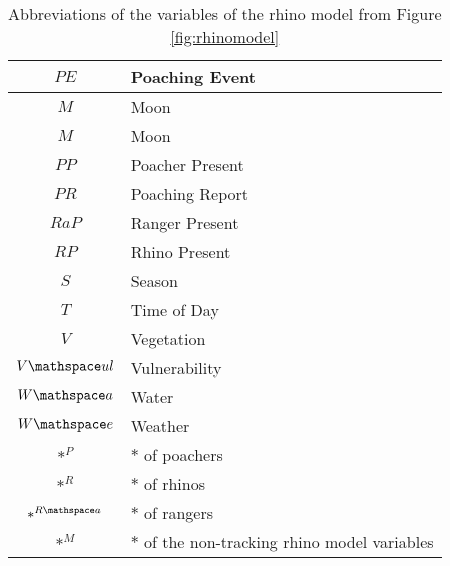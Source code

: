 \begin{table}[ht]
\centering
	\begin{tabular}{|c|l|}
		\hline
		\phantom{...} $PE$ \phantom{...} & Poaching Event \phantom{...} \\
		\hline
		$M$ & Moon \\
		\hline
		$M$ & Moon \\
		\hline
		$PP$ & Poacher Present \\
		\hline
		$PR$ & Poaching Report \\
		\hline
		$RaP$ & Ranger Present \\
		\hline
		$RP$ & Rhino Present \\
		\hline
		$S$ & Season \\
		\hline
		$T$ & Time of Day \\
		\hline
		$V$ & Vegetation \\
		\hline
		$V\mathspace ul$ & Vulnerability \\
		\hline
		$W\mathspace a$ & Water \\
		\hline
		$W\mathspace e$ & Weather \\
		\hline
		$\ast^P$ & $\ast$ of poachers \\
		\hline
		$\ast^R$ & $\ast$ of rhinos \\
		\hline
		$\ast^{R\mathspace a}$ & $\ast$ of rangers \\
		\hline
		$\ast^M$ & $\ast$ of the non-tracking rhino model variables \\
		\hline
	\end{tabular}
	\caption{Abbreviations of the variables of the rhino model from Figure \ref{fig:rhinomodel}}
	\label{tab:app-abbreviationsrhinomodel}
\end{table}